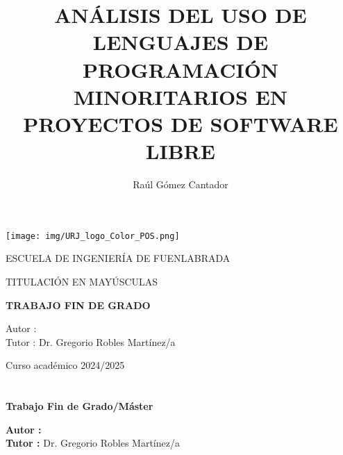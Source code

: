 \documentclass[a4paper, 12pt]{book}
\title{ANÁLISIS DEL USO DE LENGUAJES DE PROGRAMACIÓN MINORITARIOS EN PROYECTOS DE SOFTWARE LIBRE}
\author{Raúl Gómez Cantador}
\makeatletter
\let\thetitle\@title
\let\theauthor\@author
\makeatother
\begin{document}
\renewcommand{\refname}{Bibliografía}  %
\renewcommand{\appendixname}{Apéndice}



\begin{titlepage}
\begin{center}
\texttt{[image: img/URJ\_logo\_Color\_POS.png]}

\vspace{1.75cm}

\LARGE
ESCUELA DE INGENIERÍA DE FUENLABRADA
\vspace{1cm}

\LARGE
TITULACIÓN EN MAYÚSCULAS

\vspace{1cm}
\LARGE
\textbf{TRABAJO FIN DE GRADO}

\vspace{2cm}

\Large
\MakeUppercase{\thetitle}

\vspace{2cm}

\large
Autor : \theauthor \\
Tutor : Dr. Gregorio Robles Martínez/a\\
\vspace{1cm}

\large
Curso académico 2024/2025

\end{center}
\end{titlepage}

\newpage
\mbox{}
\thispagestyle{empty} %



\clearpage
{}
\chapter*{}

\vspace{-4cm}
\begin{center}
\LARGE
\textbf{Trabajo Fin de Grado/Máster}

\vspace{1cm}
\large
\thetitle

\vspace{0.8cm}
\large
\textbf{Autor :} \theauthor \\
\textbf{Tutor :} Dr. Gregorio Robles Martínez/a

\end{center}
\end{document}
